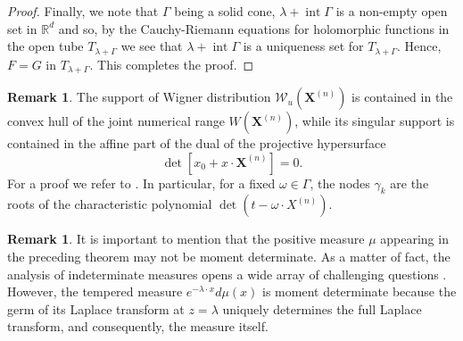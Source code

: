 \documentclass[11pt,reqno]{amsart}
\theoremstyle{plain}
\theoremstyle{definition}
\newtheorem{remark}[theorem]{Remark}
\numberwithin{equation}{section}
\begin{document}
\begin{proof}
Finally, we note that $\Gamma$ being a solid cone, $\lambda + \operatorname{int} \Gamma$ is a non-empty open set in $\mathbb{R}^d$ and so, by the Cauchy-Riemann equations for holomorphic functions in the open tube $T_{\lambda + \Gamma}$ we see that $\lambda + \operatorname{int} \Gamma$ is a uniqueness set for $T_{\lambda +\Gamma}$. Hence, $F=G$ in $T_{\lambda + \Gamma}$. This completes the proof.

\end{proof}
\begin{remark}
    The support of Wigner distribution  ${\mathcal W}_u(\boldsymbol{X}^{(n)})$ is contained in the convex hull of the joint numerical range $W(\boldsymbol{X}^{(n)})$, while its singular support is contained in {the affine part of the dual of the projective hypersurface} 
	$$ \det [ x_0 + x \cdot \boldsymbol{X}^{(n)}] = 0.$$
	For a proof we refer to \cite[Proposition 4]{SW}.
	In particular, for a fixed $\omega \in \Gamma$, the nodes $\gamma_k$ are the roots of the characteristic polynomial $\det (t - \omega \cdot X^{(n)})$.
\end{remark}

	\begin{remark}
       It is important to mention that the positive measure $\mu$ appearing in the preceding theorem may not be moment determinate. As a matter of fact, the analysis of indeterminate measures opens a wide array of challenging questions \cite{Ahiezer-Krein, Schmudgen-book}. However, the tempered measure $e^{-\lambda\cdot x} d\mu(x)$ is moment determinate because the germ of its Laplace transform at $z=\lambda$ uniquely determines the full Laplace transform, and consequently, the measure itself.
	\end{remark}
\end{document}
